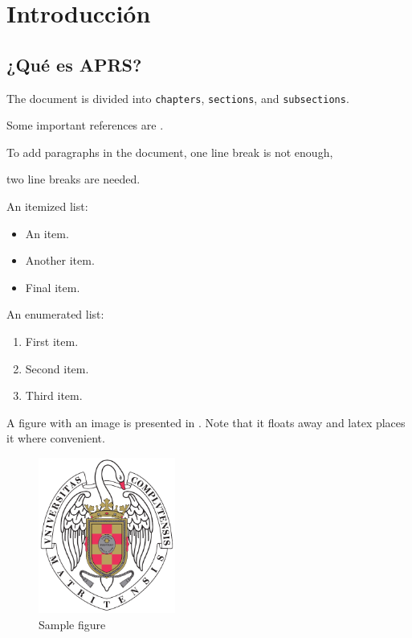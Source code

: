 \titlespacing*{\chapter}{0pt}{-1.25cm}{25pt}
\chapter{Introducción}
\section{¿Qué es APRS?}
		The document is divided into \texttt{chapters}, \texttt{sections}, and \texttt{subsections}.

		Some important references are \cite{einstein,latexcompanion,knuthwebsite}.

		To add paragraphs in the document, 
		one line break is not enough,

		two line breaks are needed.

		An itemized list:

		\begin{itemize}
			\item An item.
			\item Another item.
			\item Final item.
		\end{itemize}

		An enumerated list:

		\begin{enumerate}
			\item First item.
			\item Second item.
			\item Third item.
		\end{enumerate}

		A figure with an image is presented in . Note that it floats away and latex places it where convenient.

		\begin{figure}[h!]
			\centering
			\includegraphics[width=0.4\textwidth]{./Images/escudo_ucm.pdf}
			\caption{Sample figure}
			\label{fig:logo_ucm}
		\end{figure}

